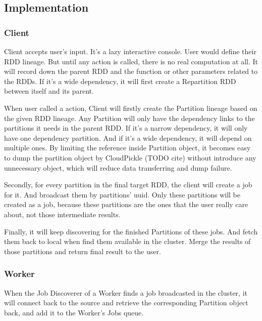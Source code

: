 

\subsection{Implementation} %
\label{sub:implementation_driver_less}

\subsubsection{Client} %
\label{ssub:client}
Client accepts user's input. It's a lazy interactive console.
User would define their RDD lineage. But until any action is called, there is no real computation at all.
It will record down the parent RDD and the function or other parameters related to the RDDs\@.
If it's a wide dependency, it will first create a Repartition RDD between itself and its parent.

When user called a action, Client will firstly create the Partition lineage based on the given RDD lineage.
Any Partition will only have the dependency links to the partitions it needs in the parent RDD\@.
If it's a narrow dependency, it will only have one dependency partition.
And if it's a wide dependency, it will depend on multiple ones.
By limiting the reference inside Partition object,
it becomes easy to dump the partition object by CloudPickle (TODO cite) without introduce any unnecessary object,
which will reduce data transferring and dump failure.

Secondly, for every partition in the final target RDD, the client will create a job for it.
And broadcast them by partitions' uuid.
Only these partitions will be created as a job,
because these partitions are the ones that the user really care about, not those intermediate results.

Finally, it will keep discovering for the finished Partitions of these jobs.
And fetch them back to local when find them available in the cluster.
Merge the results of those partitions and return final result to the user.

\subsubsection{Worker} %
\label{ssub:worker}
When the Job Discoverer of a Worker finds a job broadcasted in the cluster,
it will connect back to the source and retrieve the corresponding Partition object back,
and add it to the Worker's Jobs queue.

